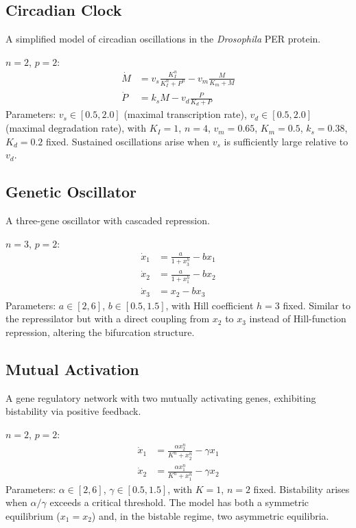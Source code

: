 \documentclass[11pt]{article}
\begin{document}
\subsection{Circadian Clock~\cite{goldbeter1995}}

A simplified model of circadian oscillations in the \emph{Drosophila} PER protein.

$n=2$, $p=2$:
\begin{align*}
\dot{M} &= v_s \frac{K_I^n}{K_I^n + P^n} - v_m \frac{M}{K_m + M} \\
\dot{P} &= k_s M - v_d \frac{P}{K_d + P}
\end{align*}
Parameters: $v_s \in [0.5, 2.0]$ (maximal transcription rate), $v_d \in [0.5, 2.0]$ (maximal degradation rate), with $K_I = 1$, $n = 4$, $v_m = 0.65$, $K_m = 0.5$, $k_s = 0.38$, $K_d = 0.2$ fixed.
Sustained oscillations arise when $v_s$ is sufficiently large relative to $v_d$.

\subsection{Genetic Oscillator}

A three-gene oscillator with cascaded repression.

$n=3$, $p=2$:
\begin{align*}
\dot{x}_1 &= \frac{a}{1 + x_3^h} - b x_1 \\
\dot{x}_2 &= \frac{a}{1 + x_1^h} - b x_2 \\
\dot{x}_3 &= x_2 - b x_3
\end{align*}
Parameters: $a \in [2, 6]$, $b \in [0.5, 1.5]$, with Hill coefficient $h = 3$ fixed.
Similar to the repressilator but with a direct coupling from $x_2$ to $x_3$ instead of Hill-function repression, altering the bifurcation structure.

\subsection{Mutual Activation}

A gene regulatory network with two mutually activating genes, exhibiting bistability via positive feedback.

$n=2$, $p=2$:
\begin{align*}
\dot{x}_1 &= \frac{\alpha x_2^n}{K^n + x_2^n} - \gamma x_1 \\
\dot{x}_2 &= \frac{\alpha x_1^n}{K^n + x_1^n} - \gamma x_2
\end{align*}
Parameters: $\alpha \in [2, 6]$, $\gamma \in [0.5, 1.5]$, with $K = 1$, $n = 2$ fixed.
Bistability arises when $\alpha / \gamma$ exceeds a critical threshold.
The model has both a symmetric equilibrium ($x_1 = x_2$) and, in the bistable regime, two asymmetric equilibria.
\end{document}
